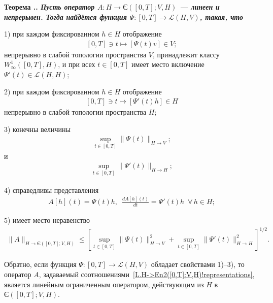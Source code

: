 \documentclass{report}
\newcounter{rem}[section]
\newcounter{theor}[section]
\renewcommand{\thetheor}{\thesection.\arabic{theor}}
\newenvironment{Theorem}{\par\refstepcounter{theor}\bf Теорема \thetheor. \it}{\rm\par}
\begin{document}
\begin{Theorem}\label{L.H->En2([0,T];V,H)!theorem}
Пусть оператор $A:H\to\textrm{Є}([0,T];V,H)$ --- линеен и непрерывен. Тогда найдётся функция $\Psi:[0,T]\to\mathcal{L}(H,V)$, такая, что

1) при каждом фиксированном $h\in H$ отображение
\begin{gather}\label{L.H->En2([0,T];V,H)!t->Phi(t)v}
[0,T]\ni t\mapsto[\Psi(t)v]\in V;
\end{gather}
непрерывно в слабой топологии пространства $V$, принадлежит классу  $W^1_\infty([0,T],H)$,  и при всех $t\in[0,T]$ имеет место включение  $\Psi'(t)\in\mathcal{L}(H,H)$;

2) при каждом фиксированном $h\in H$ отображение
\begin{gather}\label{L.H->En2([0,T];V,H)!t->Phi.t(t)v}
[0,T]\ni t\mapsto[\Psi'(t)h]\in H
\end{gather}
непрерывно в слабой топологии пространства $H$;

3) конечны величины
\begin{gather}\label{L.H->En2([0,T];V,H)!sup.wrt.t.of.norm(Phi(t))}
\sup\limits_{t\in[0,T]}\|\Psi(t)\|_{H\to V};
\end{gather}
и
\begin{gather}\label{L.H->En2([0,T];V,H)!sup.wrt.t.of.norm(Phi'(t))}
\sup\limits_{t\in[0,T]}\|\Psi'(t)\|_{H\to H};
\end{gather}

4) справедливы представления
\begin{gather}\label{L.H->En2([0,T];V,H)!representations}
A[h](t)=\Psi(t)h,\,\,\,\frac{dA[h](t)}{dt}=\Psi'(t)h\,\,\,\forall\,h\in H;
\end{gather}

5) имеет место неравенство
\begin{gather}\label{L.H->En2([0,T];V,H)!norm}
\|A\|_{H\to\textrm{Є}([0,T];V,H)}\leqslant[\sup\limits_{t\in[0,T]}\|\Psi(t)\|^2_{H\to V}+\sup\limits_{t\in[0,T]}\|\Psi'(t)\|^2_{H\to H}]^{1/2}.
\end{gather}

Обратно, если функция $\Psi:[0,T]\to\mathcal{L}(H,V)$ обладает свойствами 1)--3), то оператор $A$, задаваемый соотношениями~\eqref{L.H->En2([0,T];V,H)!representations}, является линейным ограниченным оператором, действующим из $H$ в $\textrm{Є}([0,T];V,H)$.
\end{Theorem}
\end{document}
